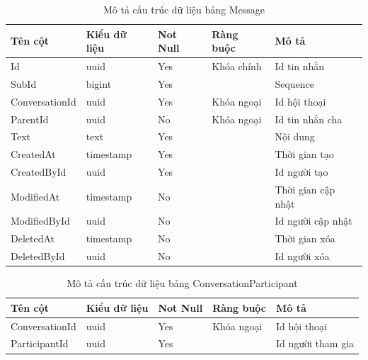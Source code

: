 \documentclass[../index.tex]{subfiles}
\begin{document}
    \begin{table}[H]
        \begin{tabular}{ |p{3cm}|p{2.5cm}|p{1.6cm}|p{2.2cm}|p{3cm}| }
            \hline
            Tên cột        & Kiểu dữ liệu             & Not Null & Ràng buộc  & Mô tả              \\
            \hline
            Id             & uuid                     & Yes      & Khóa chính & Id tin nhắn        \\
            \hline
            SubId          & bigint                   & Yes      &            & Sequence           \\
            \hline
            ConversationId & uuid                     & Yes      & Khóa ngoại & Id hội thoại       \\
            \hline
            ParentId       & uuid                     & No       & Khóa ngoại & Id tin nhắn cha    \\
            \hline
            Text           & text   & Yes      &            & Nội dung           \\
            \hline
            CreatedAt      & timestamp & Yes      &            & Thời gian tạo      \\
            \hline
            CreatedById    & uuid                     & Yes      &            & Id người tạo       \\
            \hline
            ModifiedAt     & timestamp & No       &            & Thời gian cập nhật \\
            \hline
            ModifiedById   & uuid                     & No       &            & Id người cập nhật  \\
            \hline
            DeletedAt      & timestamp & No       &            & Thời gian xóa      \\
            \hline
            DeletedById    & uuid                     & No       &            & Id người xóa       \\
            \hline
        \end{tabular}
        \caption{Mô tả cấu trúc dữ liệu bảng Message}
    \end{table}

    \begin{table}[H]
        \begin{tabular}{ |p{3cm}|p{2.5cm}|p{1.6cm}|p{2.2cm}|p{3cm}| }
            \hline
            Tên cột        & Kiểu dữ liệu & Not Null & Ràng buộc  & Mô tả             \\
            \hline
            ConversationId & uuid         & Yes      & Khóa ngoại & Id hội thoại      \\
            \hline
            ParticipantId  & uuid         & Yes      &            & Id người tham gia \\
            \hline
        \end{tabular}
        \caption{Mô tả cấu trúc dữ liệu bảng ConversationParticipant}
    \end{table}
\end{document}
